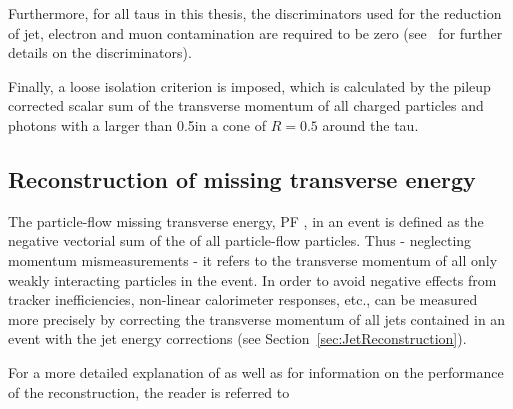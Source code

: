 Furthermore, for all taus in this thesis, the discriminators used for the reduction of jet, electron and muon contamination are required to be zero (see~\cite{bib:CMS:TauReconstruction_8TeV} for further details on the discriminators).

Finally, a loose isolation criterion is imposed, which is calculated by the pileup corrected scalar sum of the transverse momentum of all charged particles and photons with a \pt larger than 0.5\gev in a cone of $R=0.5$ around the tau.

\subsection{Reconstruction of missing transverse energy}
The particle-flow missing transverse energy, PF \met, in an event is defined as the negative vectorial sum of the \pt of all particle-flow particles.
Thus - neglecting momentum mismeasurements - it refers to the transverse momentum of all only weakly interacting particles in the event.
In order to avoid negative effects from \eg tracker inefficiencies, non-linear calorimeter responses, etc., \met can be measured more precisely by correcting the transverse momentum of all jets contained in an event with the jet energy corrections (see Section~\ref{sec:JetReconstruction}).

For a more detailed explanation of \met as well as for information on the performance of the reconstruction, the reader is referred to~\cite{bib:CMS:METReconstruction}

